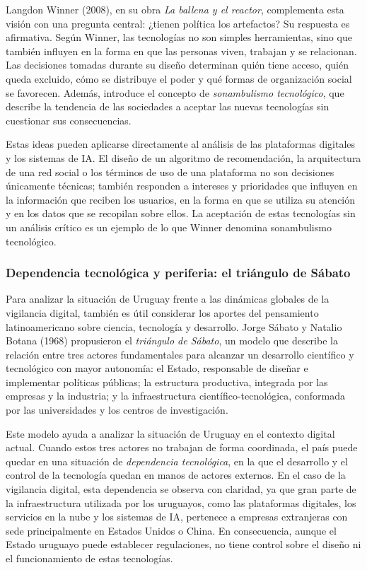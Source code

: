 \documentclass[11pt,a4paper]{article}
\begin{document}
Langdon Winner (2008), en su obra \textit{La ballena y el reactor}, complementa esta visión con una pregunta central: ¿tienen política los artefactos? Su respuesta es afirmativa. Según Winner, las tecnologías no son simples herramientas, sino que también influyen en la forma en que las personas viven, trabajan y se relacionan. Las decisiones tomadas durante su diseño determinan quién tiene acceso, quién queda excluido, cómo se distribuye el poder y qué formas de organización social se favorecen. Además, introduce el concepto de \textit{sonambulismo tecnológico}, que describe la tendencia de las sociedades a aceptar las nuevas tecnologías sin cuestionar sus consecuencias.

Estas ideas pueden aplicarse directamente al análisis de las plataformas digitales y los sistemas de IA. El diseño de un algoritmo de recomendación, la arquitectura de una red social o los términos de uso de una plataforma no son decisiones únicamente técnicas; también responden a intereses y prioridades que influyen en la información que reciben los usuarios, en la forma en que se utiliza su atención y en los datos que se recopilan sobre ellos. La aceptación de estas tecnologías sin un análisis crítico es un ejemplo de lo que Winner denomina sonambulismo tecnológico.

\subsubsection{Dependencia tecnológica y periferia: el triángulo de Sábato}

Para analizar la situación de Uruguay frente a las dinámicas globales de la vigilancia digital, también es útil considerar los aportes del pensamiento latinoamericano sobre ciencia, tecnología y desarrollo. Jorge Sábato y Natalio Botana (1968) propusieron el \textit{triángulo de Sábato}, un modelo que describe la relación entre tres actores fundamentales para alcanzar un desarrollo científico y tecnológico con mayor autonomía: el Estado, responsable de diseñar e implementar políticas públicas; la estructura productiva, integrada por las empresas y la industria; y la infraestructura científico-tecnológica, conformada por las universidades y los centros de investigación.

Este modelo ayuda a analizar la situación de Uruguay en el contexto digital actual. Cuando estos tres actores no trabajan de forma coordinada, el país puede quedar en una situación de \textit{dependencia tecnológica}, en la que el desarrollo y el control de la tecnología quedan en manos de actores externos. En el caso de la vigilancia digital, esta dependencia se observa con claridad, ya que gran parte de la infraestructura utilizada por los uruguayos, como las plataformas digitales, los servicios en la nube y los sistemas de IA, pertenece a empresas extranjeras con sede principalmente en Estados Unidos o China. En consecuencia, aunque el Estado uruguayo puede establecer regulaciones, no tiene control sobre el diseño ni el funcionamiento de estas tecnologías.
\end{document}
